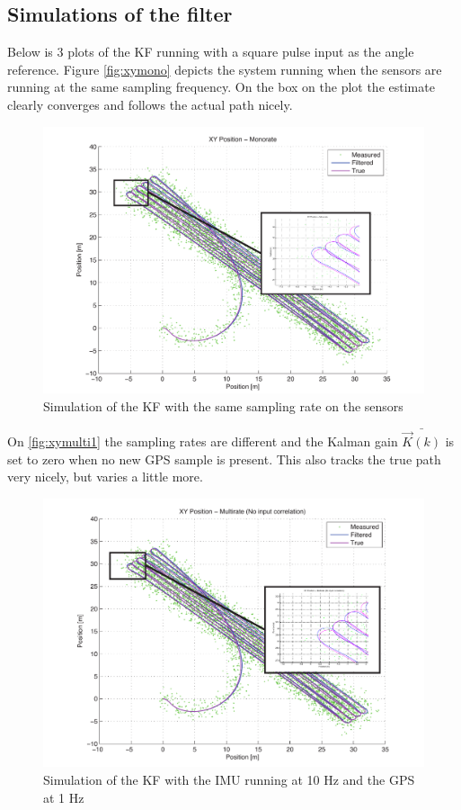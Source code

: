 \subsection{Simulations of the filter}
Below is 3 plots of the \ac{KF} running with a square pulse input as the angle reference. Figure \vref{fig:xymono} depicts the system running when the sensors are running at the same sampling frequency. On the box on the plot the estimate clearly converges and follows the actual path nicely. 

\begin{figure}[htbp]
	\centering
	\includegraphics[width=\textwidth]{img/xymono}
	\caption{Simulation of the \ac{KF} with the same sampling rate on the sensors}
	\label{fig:xymono}
\end{figure}

On \vref{fig:xymulti1} the sampling rates are different and the Kalman gain $\bar{\vec{K}(k)}$ is set to zero when no new \ac{GPS} sample is present. This also tracks the true path very nicely, but varies a little more. 

\begin{figure}[htbp]
	\centering
	\includegraphics[width=\textwidth]{img/xymultirate}
	\caption{Simulation of the \ac{KF} with the \ac{IMU} running at 10 Hz and the \ac{GPS} at 1 Hz}
	\label{fig:xymulti1}
\end{figure}

